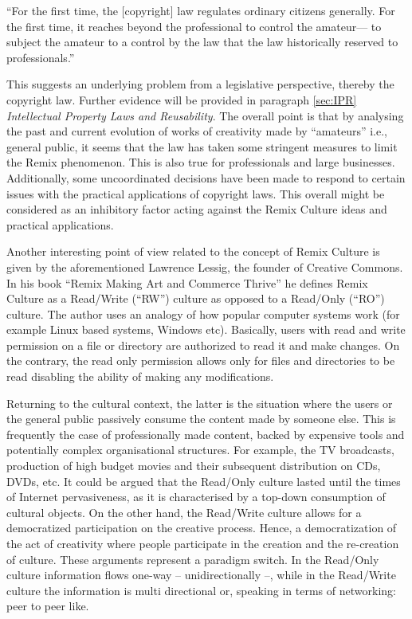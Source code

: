 \begin{displayquote}

“For the first time, the [copyright] law regulates ordinary citizens generally. For the first time, it reaches beyond the professional to control the amateur— to subject the amateur to a control by the law that the law historically reserved to professionals.”

\end{displayquote}

This suggests an underlying problem from a legislative perspective, thereby the copyright law. Further evidence will be provided in paragraph \ref{sec:IPR} \emph{Intellectual Property Laws and Reusability}. The overall point is that by analysing the past and current evolution of works of creativity made by “amateurs” i.e., general public, it seems that the law has taken some stringent measures to limit the Remix phenomenon. This is also true for professionals and large businesses. Additionally, some uncoordinated decisions have been made to respond to certain issues with the practical applications of copyright laws. This overall might be considered as an inhibitory factor acting against the Remix Culture ideas and practical applications.

Another interesting point of view related to the concept of Remix Culture is given by the aforementioned Lawrence Lessig, the founder of Creative Commons. In his book “Remix Making Art and Commerce Thrive” he defines Remix Culture as a Read/Write (“RW”) culture as opposed to a Read/Only (“RO”) culture. The author uses an analogy of how popular computer systems work (for example Linux based systems, Windows etc). Basically, users with read and write permission on a file or directory are authorized to read it and make changes. On the contrary, the read only permission allows only for files and directories to be read disabling the ability of making any modifications.

Returning to the cultural context, the latter is the situation where the users or the general public passively consume the content made by someone else. This is frequently the case of professionally made content, backed by expensive tools and potentially complex organisational structures. For example, the TV broadcasts, production of high budget movies and their subsequent distribution on CDs, DVDs, etc. It could be argued that the Read/Only culture lasted until the times of Internet pervasiveness, as it is characterised by a top-down consumption of cultural objects. On the other hand, the Read/Write culture allows for a democratized participation on the creative process. Hence, a democratization of the act of creativity where people participate in the creation and the re-creation of culture.
These arguments represent a paradigm switch. In the Read/Only culture information flows one-way – unidirectionally –, while in the Read/Write culture the information is multi directional or, speaking in terms of networking: peer to peer like.

